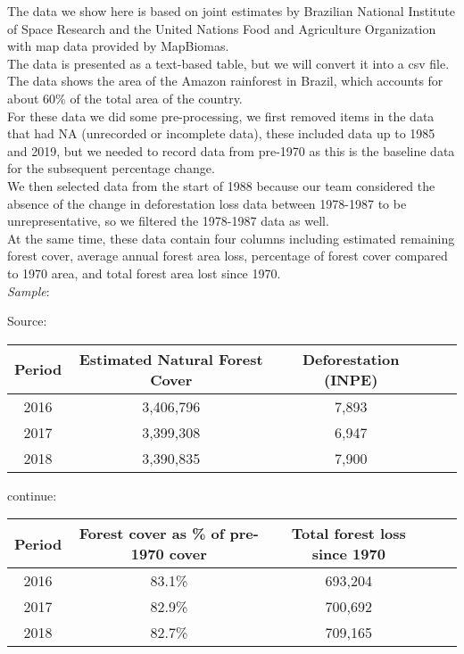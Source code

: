 \documentclass[12pt]{article}
\begin{document}
\begin{enumerate}
\begin{text}
The data we show here is based on joint estimates by Brazilian National Institute of Space Research and the United Nations Food and Agriculture Organization with map data provided by MapBiomas.\\
    The data is presented as a text-based table, but we will convert it into a csv file. The data shows the area of the Amazon rainforest in Brazil, which accounts for about 60\% of the total area of the country.\\
    For these data we did some pre-processing, we first removed items in the data that had NA (unrecorded or incomplete data), these included data up to 1985 and 2019, but we needed to record data from pre-1970 as this is the baseline data for the subsequent percentage change.\\
    We then selected data from the start of 1988 because our team considered the absence of the change in deforestation loss data between 1978-1987 to be unrepresentative, so we filtered the 1978-1987 data as well.\\
    At the same time, these data contain four columns including estimated remaining forest cover, average annual forest area loss, percentage of forest cover compared to 1970 area, and total forest area lost since 1970.\\


    \emph{Sample}:

    Source: \citep{But20}



    \begin{tabular}{ |c|c|c|c|c| }
    \hline
    Period &	Estimated Natural Forest Cover &	Deforestation (INPE) \\
      \hline
      2016 & 3,406,796  & 7,893 \\
      \hline
      2017 & 3,399,308  & 6,947  \\
      \hline
      2018 & 3,390,835  & 7,900   \\
      \hline
    \end{tabular}

    continue:

    \begin{tabular}{ |c|c|c|c|c| }
    \hline
    Period & Forest cover as \% of pre-1970 cover & Total forest loss since 1970  \\
      \hline
      2016 &  	83.1\% & 	693,204  \\
      \hline
      2017 & 82.9\% &	700,692  \\
      \hline
      2018 &  82.7\% &	709,165  \\
      \hline
    \end{tabular}
\end{text}
\newpage


\end{enumerate}
\end{document}
